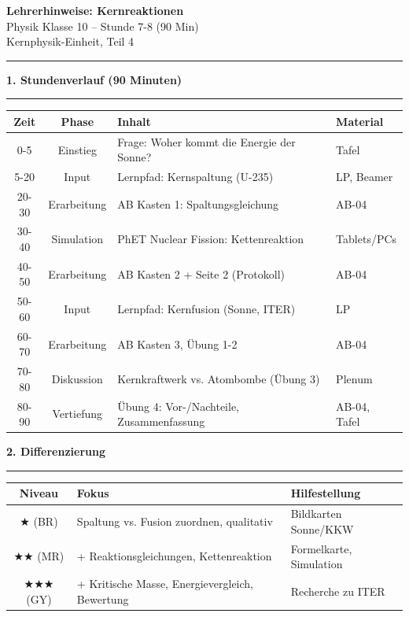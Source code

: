 \documentclass[11pt, a4paper]{article}
\newcommand{\abschnitt}[1]{%
    \vspace{10pt}\noindent\textbf{\textcolor{physik}{\large #1}}\vspace{6pt}\hrule\vspace{8pt}
}
\begin{document}
\begin{center}
{\LARGE\bfseries Lehrerhinweise: Kernreaktionen}\\[6pt]
{\large Physik Klasse 10 -- Stunde 7-8 (90 Min)}\\[4pt]
{\small\textcolor{grau}{Kernphysik-Einheit, Teil 4}}
\end{center}
\vspace{8pt}\hrule\vspace{12pt}

\abschnitt{1. Stundenverlauf (90 Minuten)}

\begin{tabularx}{\textwidth}{|c|c|X|l|}
\hline
\textbf{Zeit} & \textbf{Phase} & \textbf{Inhalt} & \textbf{Material} \\
\hline
0-5 & Einstieg & Frage: Woher kommt die Energie der Sonne? & Tafel \\
\hline
5-20 & Input & Lernpfad: Kernspaltung (U-235) & LP, Beamer \\
\hline
20-30 & Erarbeitung & AB Kasten 1: Spaltungsgleichung & AB-04 \\
\hline
30-40 & Simulation & PhET Nuclear Fission: Kettenreaktion & Tablets/PCs \\
\hline
40-50 & Erarbeitung & AB Kasten 2 + Seite 2 (Protokoll) & AB-04 \\
\hline
50-60 & Input & Lernpfad: Kernfusion (Sonne, ITER) & LP \\
\hline
60-70 & Erarbeitung & AB Kasten 3, Übung 1-2 & AB-04 \\
\hline
70-80 & Diskussion & Kernkraftwerk vs. Atombombe (Übung 3) & Plenum \\
\hline
80-90 & Vertiefung & Übung 4: Vor-/Nachteile, Zusammenfassung & AB-04, Tafel \\
\hline
\end{tabularx}

\vspace{12pt}

\abschnitt{2. Differenzierung}

\begin{tabularx}{\textwidth}{|c|X|X|}
\hline
\textbf{Niveau} & \textbf{Fokus} & \textbf{Hilfestellung} \\
\hline
★ (BR) & Spaltung vs. Fusion zuordnen, qualitativ & Bildkarten Sonne/KKW \\
\hline
★★ (MR) & + Reaktionsgleichungen, Kettenreaktion & Formelkarte, Simulation \\
\hline
★★★ (GY) & + Kritische Masse, Energievergleich, Bewertung & Recherche zu ITER \\
\hline
\end{tabularx}
\end{document}
